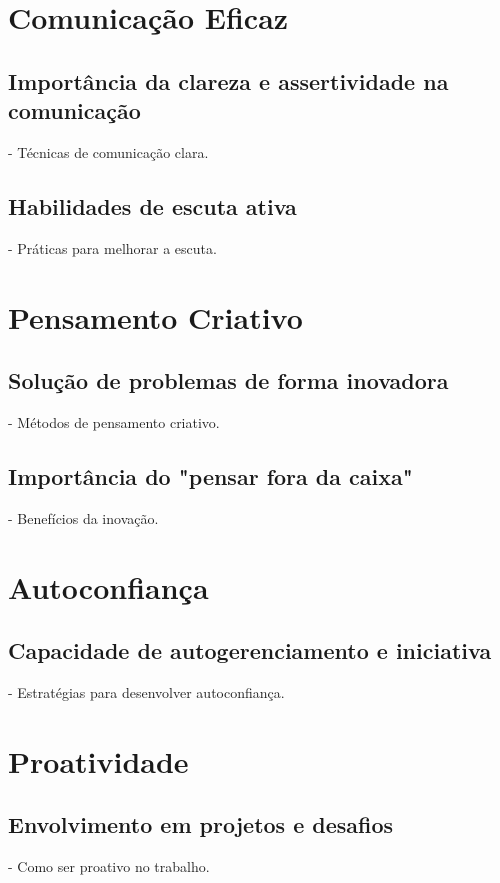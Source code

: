 \documentclass{ufersa}
\begin{document}
\maketitle

\section{Comunicação Eficaz}
\subsection{Importância da clareza e assertividade na comunicação}
- Técnicas de comunicação clara.

\subsection{Habilidades de escuta ativa}
- Práticas para melhorar a escuta.

\section{Pensamento Criativo}
\subsection{Solução de problemas de forma inovadora}
- Métodos de pensamento criativo.

\subsection{Importância do "pensar fora da caixa"}
- Benefícios da inovação.

\section{Autoconfiança}
\subsection{Capacidade de autogerenciamento e iniciativa}
- Estratégias para desenvolver autoconfiança.

\section{Proatividade}
\subsection{Envolvimento em projetos e desafios}
- Como ser proativo no trabalho.
\end{document}
